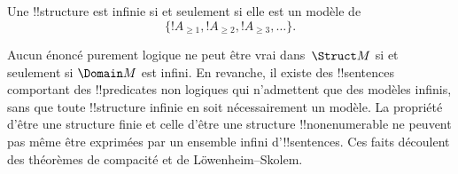\documentclass[../../../include/open-logic-section]{subfiles}
\begin{document}
\begin{prop}
Une !!{structure} est infinie si et seulement si elle est un modèle
de
\[
\{!A_{\ge 1}, !A_{\ge 2}, !A_{\ge 3}, \dots \}.
\]
\end{prop}

Aucun énoncé purement logique ne peut être vrai dans~$\Struct M$ si
et seulement si $\Domain M$ est infini. En revanche, il existe des
!!{sentence}s comportant des !!{predicate}s non logiques qui
n'admettent que des modèles infinis, sans que toute !!{structure}
infinie en soit nécessairement un modèle. La propriété d'être une
structure finie et celle d'être une structure !!{nonenumerable} ne
peuvent pas même être exprimées par un ensemble infini
d'!!{sentence}s. Ces faits découlent des théorèmes de compacité et
de Löwenheim--Skolem.
\end{document}
